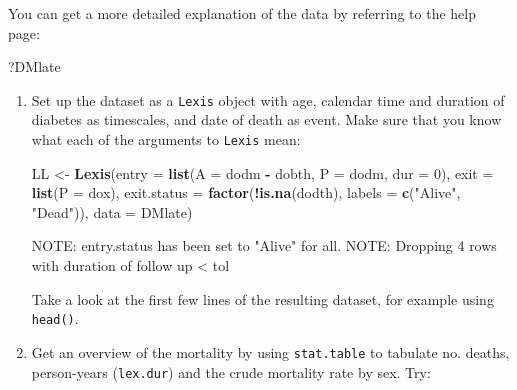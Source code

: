 \documentclass[
]{book}
\newenvironment{Shaded}{\begin{snugshade}}{\end{snugshade}}
\newcommand{\AttributeTok}[1]{\textcolor[rgb]{0.13,0.29,0.53}{#1}}
\newcommand{\DecValTok}[1]{\textcolor[rgb]{0.00,0.00,0.81}{#1}}
\newcommand{\FunctionTok}[1]{\textcolor[rgb]{0.13,0.29,0.53}{\textbf{#1}}}
\newcommand{\NormalTok}[1]{#1}
\newcommand{\OtherTok}[1]{\textcolor[rgb]{0.56,0.35,0.01}{#1}}
\newcommand{\SpecialCharTok}[1]{\textcolor[rgb]{0.81,0.36,0.00}{\textbf{#1}}}
\newcommand{\StringTok}[1]{\textcolor[rgb]{0.31,0.60,0.02}{#1}}
\begin{document}
You can get a more detailed explanation of the data by referring to
the help page:

\begin{Shaded}
\begin{Highlighting}[]
\NormalTok{?DMlate}
\end{Highlighting}
\end{Shaded}

\begin{enumerate}
\def\labelenumi{\arabic{enumi}.}
\item
  Set up the dataset as a \texttt{Lexis} object with age, calendar
  time and duration of diabetes as timescales, and date of death as
  event. Make sure that you know what each of the arguments to
  \texttt{Lexis} mean:

\begin{Shaded}
\begin{Highlighting}[]
\NormalTok{LL }\OtherTok{\textless{}{-}} \FunctionTok{Lexis}\NormalTok{(}\AttributeTok{entry =} \FunctionTok{list}\NormalTok{(}\AttributeTok{A =}\NormalTok{ dodm }\SpecialCharTok{{-}}\NormalTok{ dobth, }
                         \AttributeTok{P =}\NormalTok{ dodm, }
                       \AttributeTok{dur =} \DecValTok{0}\NormalTok{),}
             \AttributeTok{exit =} \FunctionTok{list}\NormalTok{(}\AttributeTok{P =}\NormalTok{ dox),}
      \AttributeTok{exit.status =} \FunctionTok{factor}\NormalTok{(}\SpecialCharTok{!}\FunctionTok{is.na}\NormalTok{(dodth), }
                           \AttributeTok{labels =} \FunctionTok{c}\NormalTok{(}\StringTok{"Alive"}\NormalTok{, }\StringTok{"Dead"}\NormalTok{)),}
             \AttributeTok{data =}\NormalTok{ DMlate)}
\end{Highlighting}
\end{Shaded}

\begin{Shaded}
\begin{Highlighting}[]
\NormalTok{NOTE: entry.status has been set to "Alive" for all.}
\NormalTok{NOTE: Dropping  4  rows with duration of follow up \textless{} tol}
\end{Highlighting}
\end{Shaded}

  Take a look at the first few lines of the resulting dataset, for
  example using \texttt{head()}.
\item
  Get an overview of the mortality by using \texttt{stat.table}
  to tabulate no. deaths, person-years (\texttt{lex.dur}) and the
  crude mortality rate by sex. Try:


\end{enumerate}
\end{document}

